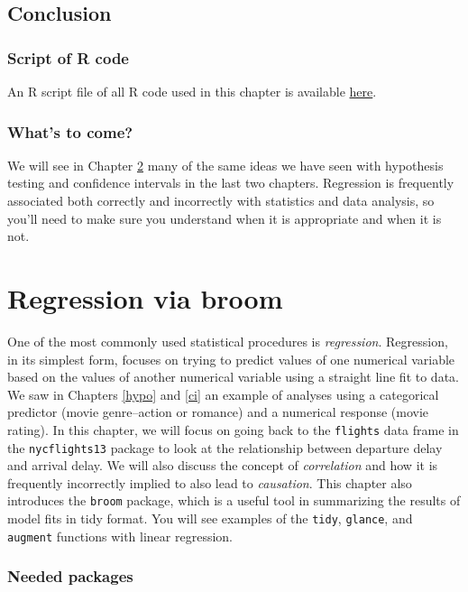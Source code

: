 \documentclass[]{tufte-book}
\theoremstyle{definition}
\theoremstyle{definition}
\theoremstyle{remark}
\begin{document}
\section{Conclusion}\label{conclusion-4}

\subsection{Script of R code}\label{script-of-r-code-4}

An R script file of all R code used in this chapter is available
\href{http://ismayc.github.io/moderndiver-book/scripts/08-ci.R}{here}.

\subsection{What's to come?}\label{whats-to-come-5}

We will see in Chapter \ref{regress} many of the same ideas we have seen
with hypothesis testing and confidence intervals in the last two
chapters. Regression is frequently associated both correctly and
incorrectly with statistics and data analysis, so you'll need to make
sure you understand when it is appropriate and when it is not.

\chapter{Regression via broom}\label{regress}

One of the most commonly used statistical procedures is
\emph{regression}. Regression, in its simplest form, focuses on trying
to predict values of one numerical variable based on the values of
another numerical variable using a straight line fit to data. We saw in
Chapters \ref{hypo} and \ref{ci} an example of analyses using a
categorical predictor (movie genre--action or romance) and a numerical
response (movie rating). In this chapter, we will focus on going back to
the \texttt{flights} data frame in the \texttt{nycflights13} package to
look at the relationship between departure delay and arrival delay. We
will also discuss the concept of \emph{correlation} and how it is
frequently incorrectly implied to also lead to \emph{causation}. This
chapter also introduces the \texttt{broom} package, which is a useful
tool in summarizing the results of model fits in tidy format. You will
see examples of the \texttt{tidy}, \texttt{glance}, and \texttt{augment}
functions with linear regression.

\subsection*{Needed packages}\label{needed-packages-6}
\end{document}
